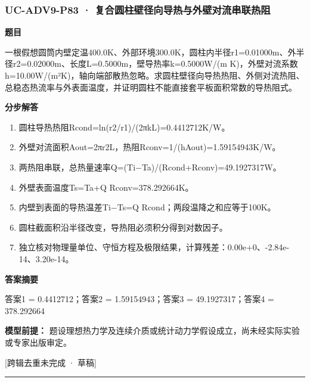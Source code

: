 \documentclass[UTF8,11pt,a4paper]{ctexart}
\begin{document}
\subsubsection*{UC-ADV9-P83 · 复合圆柱壁径向导热与外壁对流串联热阻}
\noindent\textbf{题目}\par
一根假想圆筒内壁定温400.0K、外部环境300.0K，圆柱内半径r1=0.01000m、外半径r2=0.02000m、长度L=0.5000m，壁导热率k=0.5000W/(m K)，外壁对流系数h=10.00W/(m²K)，轴向端部散热忽略。求圆柱壁径向导热热阻、外侧对流热阻、总稳态热流率与外表面温度，并证明圆柱不能直接套平板面积常数的导热阻式。\par
\medskip\noindent\textbf{分步解答}
\begin{enumerate}
\item 圆柱导热热阻Rcond=ln(r2/r1)/(2πkL)=0.4412712K/W。
\item 外壁对流面积Aout=2πr2L，热阻Rconv=1/(hAout)=1.59154943K/W。
\item 两热阻串联，总热量速率Q=(Ti−Ta)/(Rcond+Rconv)=49.1927317W。
\item 外壁表面温度Ts=Ta+Q Rconv=378.292664K。
\item 内壁到表面的导热温差Ti−Ts=Q Rcond；两段温降之和应等于100K。
\item 圆柱截面积沿半径改变，导热阻必须积分得到对数因子。
\item 独立核对物理量单位、守恒方程及极限结果，计算残差：0.00e+0、-2.84e-14、3.20e-14。
\end{enumerate}
\noindent\textbf{答案摘要}\par
答案1 = 0.4412712；答案2 = 1.59154943；答案3 = 49.1927317；答案4 = 378.292664\par
\noindent\textbf{模型前提：}
题设理想热力学及连续介质或统计动力学假设成立，尚未经实际实验或专家出版审定。\par
\noindent\textcolor{red!65!black}{[跨辑去重未完成 · 草稿]} \par
\medskip\hrule\medskip
{}
\end{document}
